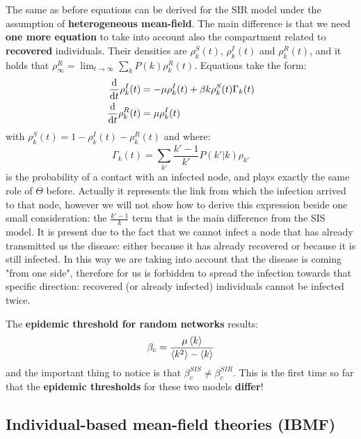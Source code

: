 \documentclass[../main/main.tex]{subfiles}
\begin{document}
The same as before equations can be derived for the SIR model under the assumption of \textbf{heterogeneous mean-field}. The main difference is that we need \textbf{one more equation} to take into account also the compartment related to \textbf{recovered} individuals. Their densities are \( \rho _k^S(t) \), \( \rho _k^I (t) \) and \( \rho _k^R (t) \), and it holds that \( \rho _ \infty ^R = \lim_{t \rightarrow \infty } \sum_{k}^{} P(k) \rho _k^R (t) \).
Equations take the form:
\begin{equation}
\begin{split}
  \dv{}{t} \rho _k^I (t) &= - \mu \rho _k^I (t) + \beta k \rho _k^S (t) \Gamma _k(t)  \\
  \dv{}{t} \rho _k^R (t) &= \mu \rho _k^I (t)
\end{split}
\end{equation}
with \( \rho _k^S (t) = 1 - \rho _k^I (t) - \rho _k^R (t)\) and where:
\begin{equation}
  \Gamma _k (t) = \sum_{k'}^{} \frac{k'-1}{k'} P(k'|k) \rho _{k'}
\end{equation}
is the probability of a contact with an infected node, and plays exactly the same role of \( \Theta  \) before.
Actually it represents the link from which the infection arrived to that node, however we will not show how to derive this expression beside one small consideration: the $\frac{k'-1}{k}$ term that is the main difference from the SIS model. It is present due to the fact that we cannot infect a node that has already transmitted us the disease: either because it has already recovered or because it is still infected. In this way we are taking into account that the disease is coming "from one side", therefore for us is forbidden to spread the infection towards that specific direction: recovered (or already infected) individuals cannot be infected twice.

The \textbf{epidemic threshold for random networks} results:
\begin{equation}
  \beta _c = \frac{\mu \expval{k} }{\expval{k^2} - \expval{k} }
\end{equation}
and the important thing to notice is that \( \beta _c^{SIS} \neq \beta _c^{SIR} \). This is the first time so far that the \textbf{epidemic thresholds} for these two models \textbf{differ}!

\subsection{Individual-based mean-field theories (IBMF)}
\end{document}
